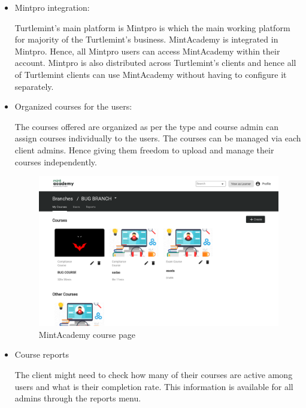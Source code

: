 \begin{itemize}
    \item Mintpro integration:

    Turtlemint's main platform is Mintpro is which the main working platform
    for majority of the Turtlemint's business. MintAcademy is integrated in
    Mintpro. Hence, all Mintpro users can access MintAcademy within their
    account. Mintpro is also distributed across Turtlemint's clients and hence
    all of Turtlemint clients can use MintAcademy without having to configure
    it separately.

    \item Organized courses for the users:
    
    The courses offered are organized as per the type and course admin can
    assign courses individually to the users. The courses can be managed via
    each client admins. Hence giving them freedom to upload and manage their
    courses independently.

    \begin{figure}
        \includegraphics[width=\textwidth]{ch5/lms_courses.png}
        \caption{MintAcademy course page}
    \end{figure}

    \item Course reports
    
    The client might need to check how many of their courses are active among
    users and what is their completion rate. This information is available for
    all admins through the reports menu.


\end{itemize}
